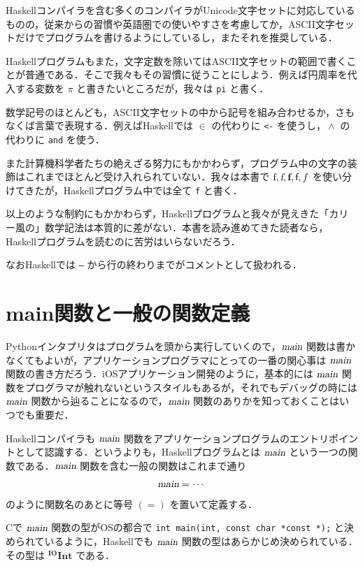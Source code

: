 \documentclass[a4paper,twocolumn]{jsbook}
\newcommand{\programminglanguage}[1]{\textsf{#1}}
\newcommand{\clang}{\programminglanguage{C}}
\newcommand{\haskell}{\programminglanguage{Haskell}}
\newcommand{\python}{\programminglanguage{Python}}
\newcommand{\code}[1]{\texttt{#1}}
\newcommand{\mAction}[1]{\textsl{#1}}
\DeclareMathOperator{\mMain}{\mAction{main}}
\DeclareMathOperator{\mFrom}{\in}
\DeclareMathOperator{\mLogicalAnd}{\wedge}
\newcommand{\mType}[1]{\mathbf{#1}}
\newcommand{\mIntType}{\mType{Int}}
\newcommand{\mIOType}{\mType{IO}}
\newcommand{\mIOIntType}{{}^\mIOType\mIntType}
\begin{document}
\haskell コンパイラを含む多くのコンパイラがUnicode文字セットに対応しているものの，従来からの習慣や英語圏での使いやすさを考慮してか，ASCII文字セットだけでプログラムを書けるようにしているし，またそれを推奨している．

\haskell プログラムもまた，文字定数を除いてはASCII文字セットの範囲で書くことが普通である．そこで我々もその習慣に従うことにしよう．例えば円周率を代入する変数を $\pi$ と書きたいところだが，我々は \code{pi} と書く．

数学記号のほとんども，ASCII文字セットの中から記号を組み合わせるか，さもなくば言葉で表現する．例えば\haskell では $\mFrom$ の代わりに \code{<-} を使うし，$\mLogicalAnd$ の代わりに \code{and} を使う．

また計算機科学者たちの絶えざる努力にもかかわらず，プログラム中の文字の装飾はこれまでほとんど受け入れられていない．我々は本書で $\textrm{f},\textsl{f},\textbf{f},\textsf{f},f$ を使い分けてきたが，\haskell プログラム中では全て \code{f} と書く．

以上のような制約にもかかわらず，\haskell プログラムと我々が見えきた「カリー風の」数学記法は本質的に差がない．本書を読み進めてきた読者なら，\haskell プログラムを読むのに苦労はいらないだろう．

なお\haskell では \code{--} から行の終わりまでがコメントとして扱われる．

\section{main関数と一般の関数定義}

\python インタプリタはプログラムを頭から実行していくので，$\mMain$ 関数は書かなくてもよいが，アプリケーションプログラマにとっての一番の関心事は $\mMain$ 関数の書き方だろう．iOSアプリケーション開発のように，基本的には $\mMain$ 関数をプログラマが触れないというスタイルもあるが，それでもデバッグの時には $\mMain$ 関数から辿ることになるので，$\mMain$ 関数のありかを知っておくことはいつでも重要だ．

\haskell コンパイラも $\mMain$ 関数をアプリケーションプログラムのエントリポイントとして認識する．というよりも，\haskell プログラムとは $\mMain$ という一つの関数である．$\mMain$ 関数を含む一般の関数はこれまで通り
\begin{equation}
\mMain=\dotsb
\end{equation}
のように関数名のあとに等号 $(=)$ を置いて定義する．

\clang で $\mMain$ 関数の型がOSの都合で \code{int main(int, const char *const *);} と決められているように，\haskell でも $\mMain$ 関数の型はあらかじめ決められている．その型は $\mIOIntType$ である． 
\end{document}
